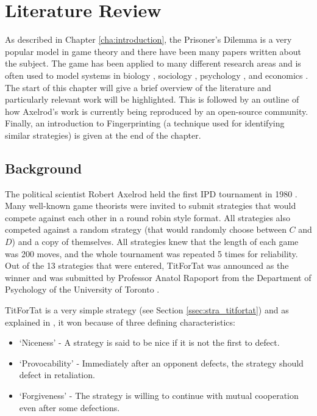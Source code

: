 
\chapter{Literature Review}\label{cha:literature}

As described in Chapter \ref{cha:introduction}, the Prisoner's Dilemma is a very popular model in game theory and there have been many papers written about the subject.
The game has been applied to many different research areas and is often used to model systems in biology \cite{Sigmund1999}, sociology \cite{Franken2005}, psychology \cite{Ishibuchi2005}, and economics \cite{Chong2005}.
The start of this chapter will give a brief overview of the literature and particularly relevant work will be highlighted.
This is followed by an outline of how Axelrod's work is currently being reproduced by an open-source community.
Finally, an introduction to Fingerprinting (a technique used for identifying similar strategies) is given at the end of the chapter.


\section{Background}\label{sec:axelrodoriginal}

The political scientist Robert Axelrod held the first IPD tournament in 1980 \cite{Axelrod1980a}.
Many well-known game theorists were invited to submit strategies that would compete against each other in a round robin style format.
All strategies also competed against a random strategy (that would randomly choose between $C$ and $D$) and a copy of themselves.
All strategies knew that the length of each game was 200 moves, and the whole tournament was repeated 5 times for reliability.
Out of the 13 strategies that were entered, TitForTat was announced as the winner and was submitted by Professor Anatol Rapoport from the Department of Psychology of the University of Toronto \cite{Rapoport2015}.

TitForTat is a very simple strategy (see Section \ref{ssec:stra_titfortat}) and as explained in \cite{Axelrod1980b}, it won because of three defining characteristics:

\begin{itemize}
    \item `Niceness' - A strategy is said to be nice if it is not the first to defect.
    \item `Provocability' - Immediately after an opponent defects, the strategy should defect in retaliation.
    \item `Forgiveness' - The strategy is willing to continue with mutual cooperation even after some defections.
\end{itemize}

